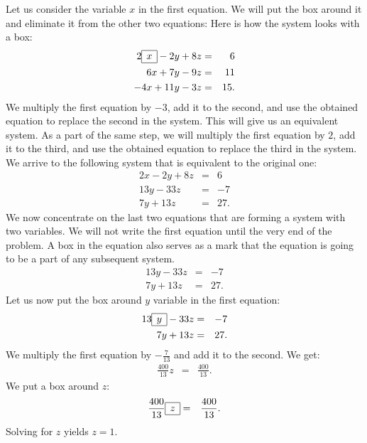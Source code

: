 Let us consider the variable \( x \) in the first equation. We will put the box around it and eliminate it from the other two equations: Here is how the system looks with a box: \begin{eqnarray*} 2\begin{array}{|c|}\hline x\\\hline\end{array}-2y+8z&=&6\\ 6x+7y-9z&=&11\\ -4x+11y-3z&=&15. \end{eqnarray*} We multiply the first equation by \( -3 \), add it to the second, and use the obtained equation to replace the second in the system. This will give us an equivalent system. As a part of the same step, we will multiply the first equation by \( 2 \), add it to the third, and use the obtained equation to replace the third in the system. We arrive to the following system that is equivalent to the original one: \begin{eqnarray*} 2x-2y+8z&=&6\\ 13y-33z&=&-7\\ 7y+13z&=&27. \end{eqnarray*} We now concentrate on the last two equations that are forming a system with two variables. We will not write the first equation until the very end of the problem. A box in the equation also serves as a mark that the equation is going to be a part of any subsequent system. \begin{eqnarray*} 13y-33z&=&-7\\ 7y+13z&=&27. \end{eqnarray*} Let us now put the box around \( y \) variable in the first equation: \begin{eqnarray*} 13\begin{array}{|c|}\hline y\\\hline\end{array}-33z&=&-7\\ 7y+13z&=&27. \end{eqnarray*} We multiply the first equation by \( -\frac7{13} \) and add it to the second. We get: \begin{eqnarray*} \frac{400}{13}z&=&\frac{400}{13}. \end{eqnarray*} We put a box around \( z \): \begin{eqnarray*} \frac{400}{13}\begin{array}{|c|}\hline z\\\hline\end{array}&=&\frac{400}{13}. \end{eqnarray*} Solving for \( z \) yields \( z=1 \).

